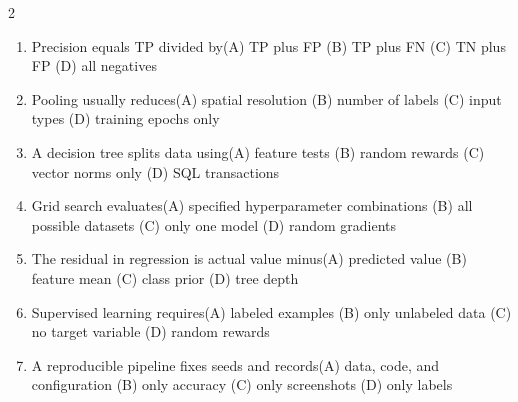 \documentclass[a4paper]{article}
\begin{document}
\begin{multicols*}{2}
\begin{enumerate}
\item Precision equals TP divided by\newline\hspace*{0.6em}(A) TP plus FP \quad (B) TP plus FN \newline\hspace*{0.6em}(C) TN plus FP \quad (D) all negatives
\item Pooling usually reduces\newline\hspace*{0.6em}(A) spatial resolution \quad (B) number of labels \newline\hspace*{0.6em}(C) input types \quad (D) training epochs only
\item A decision tree splits data using\newline\hspace*{0.6em}(A) feature tests \quad (B) random rewards \newline\hspace*{0.6em}(C) vector norms only \quad (D) SQL transactions
\item Grid search evaluates\newline\hspace*{0.6em}(A) specified hyperparameter combinations \quad (B) all possible datasets \newline\hspace*{0.6em}(C) only one model \quad (D) random gradients
\item The residual in regression is actual value minus\newline\hspace*{0.6em}(A) predicted value \quad (B) feature mean \newline\hspace*{0.6em}(C) class prior \quad (D) tree depth
\item Supervised learning requires\newline\hspace*{0.6em}(A) labeled examples \quad (B) only unlabeled data \newline\hspace*{0.6em}(C) no target variable \quad (D) random rewards
\item A reproducible pipeline fixes seeds and records\newline\hspace*{0.6em}(A) data, code, and configuration \quad (B) only accuracy \newline\hspace*{0.6em}(C) only screenshots \quad (D) only labels

\end{enumerate}
\end{multicols*}
\end{document}
